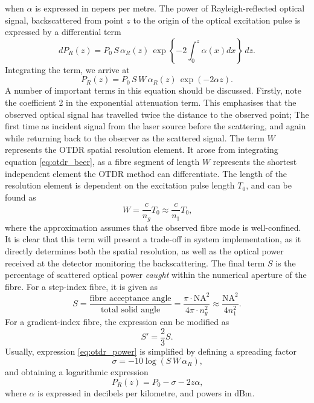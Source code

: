 \documentclass{standalone}
\begin{document}
when $\alpha$ is expressed in nepers per metre. The power of Rayleigh-reflected optical signal, backscattered from point $z$ to the origin of the optical excitation pulse is expressed by a differential term
\begin{equation} \label{eq:otdr_beer}
dP_R(z) = P_0 \, S \, \alpha_R(z) \, \exp\left\{ -2 \int_{0}^{z} \alpha(x) dx \right\} \, dz \textrm{.}
\end{equation}
Integrating the term, we arrive at
\begin{equation} \label{eq:otdr_power}
P_R(z) = P_0 \, S \, W \, \alpha_R(z) \, \exp\left(-2 \alpha z\right) \textrm{.}
\end{equation}
A number of important terms in this equation should be discussed. Firstly, note the coefficient 2 in the exponential attenuation term. This emphasises that the observed optical signal has travelled twice the distance to the observed point; The first time as incident signal from the laser source before the scattering, and again while returning back to the observer as the scattered signal. The term $W$ represents the OTDR spatial resolution element. It arose from integrating equation \ref{eq:otdr_beer}, as a fibre segment of length $W$ represents the shortest independent element the OTDR method can differentiate. The length of the resolution element is dependent on the excitation pulse length $T_0$, and can be found as
\begin{equation} \label{eq:otdr_resolution}
W = \frac{c}{n_g} T_0 \approx \frac{c}{n_1} T_0 \textrm{,}
\end{equation}
where the approximation assumes that the observed fibre mode is well-confined. It is clear that this term will present a trade-off in system implementation, as it directly determines both the spatial resolution, as well as the optical power received at the detector monitoring the backscattering. The final term $S$ is the percentage of scattered optical power \textit{caught} within the numerical aperture of the fibre. For a step-index fibre, it is given as
\begin{equation}
S = \frac{\textrm{fibre acceptance angle}}{\textrm{total solid angle}} = \frac{\pi \cdot \textrm{NA}^2}{4 \pi \cdot n_g^2} \approx \frac{\textrm{NA}^2}{4n_1^2} \textrm{.}
\end{equation}
For a gradient-index fibre, the expression can be modified as
\begin{equation}
S' = \frac{2}{3} S \textrm{.}
\end{equation}
Usually, expression \ref{eq:otdr_power} is simplified by defining a spreading factor
\begin{equation}
\sigma = -10 \log \left( S \, W \, \alpha_R \right) \textrm{,}
\end{equation}
and obtaining a logarithmic expression
\begin{equation}
P_R(z) = P_0 - \sigma - 2 z \alpha \textrm{,}
\end{equation}
where $\alpha$ is expressed in decibels per kilometre, and powers in dBm. \\
\end{document}
